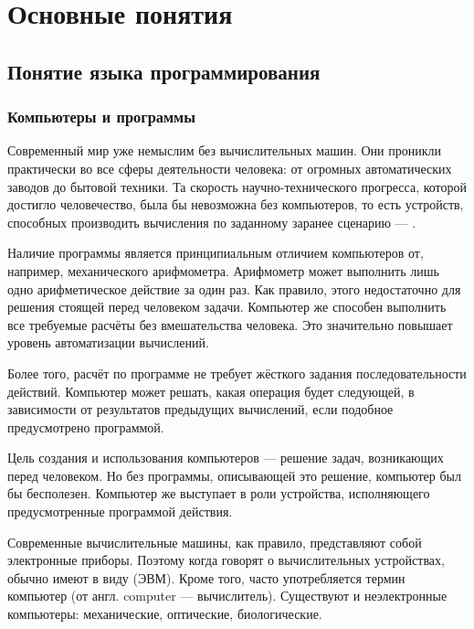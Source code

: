 \chapter{Основные понятия}

\section{Понятие языка программирования}

\subsection{Компьютеры и программы}

Современный мир уже немыслим без вычислительных машин. Они проникли
практически во все сферы деятельности человека: от огромных
автоматических заводов до бытовой техники. Та скорость
научно-технического прогресса, которой достигло человечество, была бы
невозможна без компьютеров, то есть устройств, способных производить
вычисления по заданному заранее сценарию —
.

Наличие программы является принципиальным отличием компьютеров от,
например, механического арифмометра. Арифмометр может выполнить лишь
одно арифметическое действие за один раз. Как правило, этого
недостаточно для решения стоящей перед человеком задачи. Компьютер же
способен выполнить все требуемые расчёты без вмешательства
человека. Это значительно повышает уровень автоматизации вычислений.

Более того, расчёт по программе не требует жёсткого задания
последовательности действий. Компьютер может решать, какая операция
будет следующей, в зависимости от результатов предыдущих вычислений,
если подобное предусмотрено программой.

Цель создания и использования компьютеров — решение задач, возникающих
перед человеком. Но без программы, описывающей это решение, компьютер
был бы бесполезен. Компьютер же выступает в роли устройства,
исполняющего предусмотренные программой действия.

Современные вычислительные машины, как правило, представляют собой
электронные приборы. Поэтому когда говорят о вычислительных
устройствах, обычно имеют в виду  (ЭВМ).  Кроме
того, часто употребляется термин компьютер (от англ. computer —
вычислитель). Существуют и неэлектронные компьютеры: механические,
оптические, биологические.

